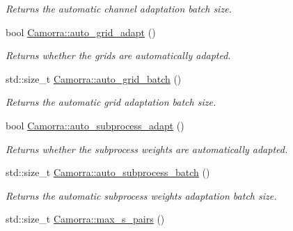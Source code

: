 \begin{DoxyCompactItemize}
\begin{DoxyCompactList}\small\item\em Returns the automatic channel adaptation batch size. \end{DoxyCompactList}\item 
\hypertarget{a00800_a3eb8fdc33ee9ad8abe5a6d34f618d728}{
bool \hyperlink{a00800_a3eb8fdc33ee9ad8abe5a6d34f618d728}{Camorra::auto\_\-grid\_\-adapt} ()}
\label{a00800_a3eb8fdc33ee9ad8abe5a6d34f618d728}

\begin{DoxyCompactList}\small\item\em Returns whether the grids are automatically adapted. \end{DoxyCompactList}\item 
\hypertarget{a00800_a05dbff54114523243a557bbb5926318c}{
std::size\_\-t \hyperlink{a00800_a05dbff54114523243a557bbb5926318c}{Camorra::auto\_\-grid\_\-batch} ()}
\label{a00800_a05dbff54114523243a557bbb5926318c}

\begin{DoxyCompactList}\small\item\em Returns the automatic grid adaptation batch size. \end{DoxyCompactList}\item 
\hypertarget{a00800_a7bdb9a311256e2eccd7226388eb134b9}{
bool \hyperlink{a00800_a7bdb9a311256e2eccd7226388eb134b9}{Camorra::auto\_\-subprocess\_\-adapt} ()}
\label{a00800_a7bdb9a311256e2eccd7226388eb134b9}

\begin{DoxyCompactList}\small\item\em Returns whether the subprocess weights are automatically adapted. \end{DoxyCompactList}\item 
\hypertarget{a00800_a2a61f1f6ed9e6d02037901d43011778f}{
std::size\_\-t \hyperlink{a00800_a2a61f1f6ed9e6d02037901d43011778f}{Camorra::auto\_\-subprocess\_\-batch} ()}
\label{a00800_a2a61f1f6ed9e6d02037901d43011778f}

\begin{DoxyCompactList}\small\item\em Returns the automatic subprocess weights adaptation batch size. \end{DoxyCompactList}\item 
\hypertarget{a00800_ac97f5f2467de9e46507d5f01081375cf}{
std::size\_\-t \hyperlink{a00800_ac97f5f2467de9e46507d5f01081375cf}{Camorra::max\_\-s\_\-pairs} ()}
\label{a00800_ac97f5f2467de9e46507d5f01081375cf}


\end{DoxyCompactItemize}

